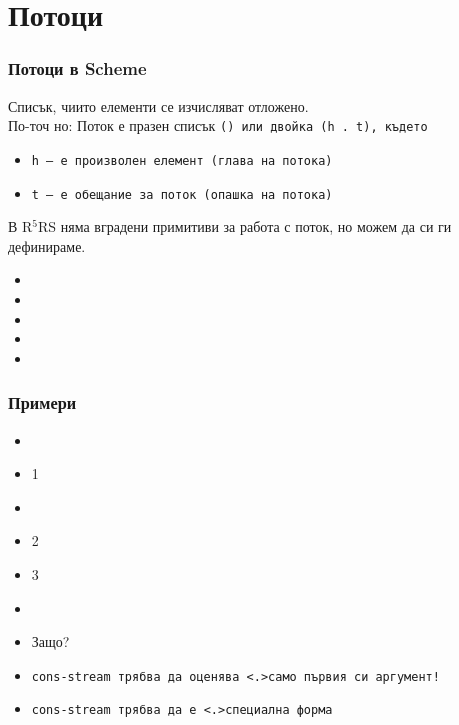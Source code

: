 \documentclass{beamer}
\begin{document}
\section{Потоци}

\begin{frame}
  \frametitle{Потоци в Scheme}

  \begin{definition}[Поток]
    Списък, чиито елементи се изчисляват отложено. \\
    \pause
    По-точ
    но: Поток е празен списък \tt{()} или двойка \tt{(h . t)}, където
      \begin{itemize}
      \item \tt h --- е произволен елемент (глава на потока)
      \item \tt t --- е \alert{обещание} за поток (опашка на потока)
      \end{itemize}
  \end{definition}
  \pause
  В R$^5$RS няма вградени примитиви за работа с поток, но можем да си ги дефинираме.
  \pause
  \begin{itemize}[<+->]
  \item {}
  \item {}
  \item {}
  \item {}
  \item {}
  \end{itemize}
\end{frame}

\begin{frame}[fragile]
  \frametitle{Примери}

  \begin{itemize}[<+->]
  \item {}
  \item {}1
  \item {}
  \item {}2
  \item {}3
  \item {}
  \item<+-| alert@+>Защо?
  \item \tt{cons-stream} трябва да оценява \alert<.>{само първия си аргумент}!
  \item \tt{cons-stream} трябва да е \alert<.>{специална форма}
  \end{itemize}
\end{frame}
\end{document}
